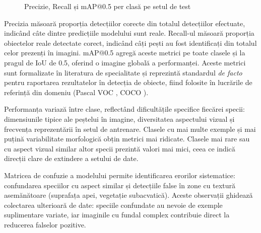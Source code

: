 \begin{figure}[H]
\centering
{}
\caption{Precizie, Recall și mAP@0.5 per clasă pe setul de test}
\label{fig:metrici-per-clasa}
\end{figure}

Precizia măsoară proporția detecțiilor corecte din totalul detecțiilor efectuate, indicând câte dintre predicțiile modelului sunt reale. Recall-ul măsoară proporția obiectelor reale detectate corect, indicând câți pești au fost identificați din totalul celor prezenți în imagini. mAP@0.5 agregă aceste metrici pe toate clasele și la pragul de IoU de 0.5, oferind o imagine globală a performanței. Aceste metrici sunt formalizate în literatura de specialitate \citep{powers2011} și reprezintă standardul \emph{de facto} pentru raportarea rezultatelor în detecția de obiecte, fiind folosite în lucrările de referință din domeniu (Pascal VOC \citep{everingham2010pascal}, COCO \citep{lin2014coco}).

Performanța variază între clase, reflectând dificultățile specifice fiecărei specii: dimensiunile tipice ale peștelui în imagine, diversitatea aspectului vizual și frecvența reprezentării în setul de antrenare. Clasele cu mai multe exemple și mai puțină variabilitate morfologică obțin metrici mai ridicate. Clasele mai rare sau cu aspect vizual similar altor specii prezintă valori mai mici, ceea ce indică direcții clare de extindere a setului de date.

Matricea de confuzie a modelului permite identificarea erorilor sistematice: confundarea speciilor cu aspect similar și detecțiile false în zone cu textură asemănătoare (suprafața apei, vegetație subacvatică). Aceste observații ghidează colectarea ulterioară de date: speciile confundate au nevoie de exemple suplimentare variate, iar imaginile cu fundal complex contribuie direct la reducerea falselor pozitive.


